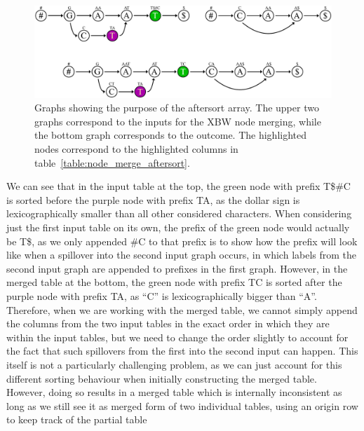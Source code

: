 \documentclass[a4paper,12pt,twoside,BCOR=10mm]{scrbook}
\begin{document}
\begin{figure}[!htb]
\centering
\includegraphics[width=\textwidth]{evo_fig_node_merge_aftersort.pdf}
\caption[Graphs showing purpose of aftersort array]{Graphs showing the purpose of the aftersort array. The upper two graphs correspond to the inputs for the XBW node merging, while the bottom graph corresponds to the outcome. The highlighted nodes correspond to the highlighted columns in table~\ref{table:node_merge_aftersort}.} \label{fig:evo_fig_node_merge_aftersort}
\end{figure}
We can see that in the input table at the top, the green node with prefix T\$$\#$C is sorted
before the purple node with prefix TA,
as the dollar sign is lexicographically smaller
than all other considered characters.
When considering just the first input table on its own, the prefix of the green node would actually be T\$,
as we only appended $\#$C to that prefix is to show
how the prefix will look like when a spillover into the second input graph occurs, in which labels from the
second input graph are appended to prefixes in the first graph.
However, in the merged table at the bottom, the green node with prefix TC is sorted after the purple node with prefix TA,
as “C” is lexicographically bigger than “A”. \\
Therefore, when we are working with the merged table, we cannot simply append the columns from the two input
tables in the exact order in which they are within the input tables, but we need to change the order slightly
to account for the fact that such spillovers from the first into the second input can happen.
This itself is not a particularly challenging problem, as we can just account for this different sorting
behaviour when initially constructing the merged table. \\
However, doing so results in a merged table which is internally inconsistent as long as we still
see it as merged form of two individual tables, using an origin row to keep track of the partial table
\end{document}
